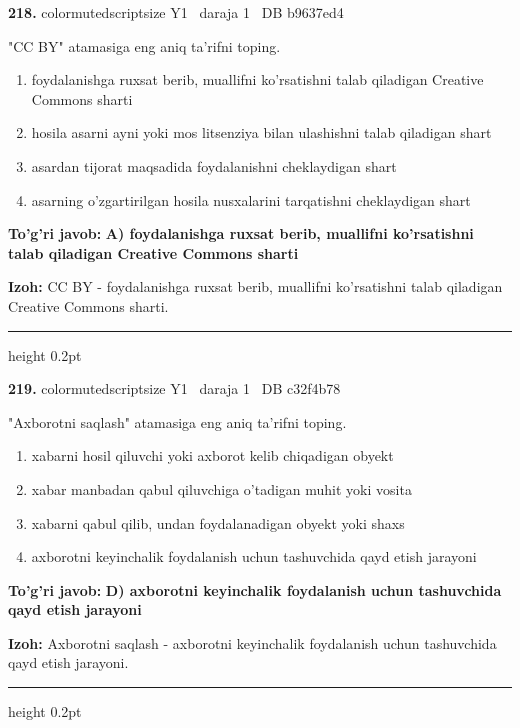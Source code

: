 \documentclass[10pt,a4paper,oneside]{article}
\begin{document}
\noindent\textbf{\color{ink}218.}  {color{muted}scriptsize Y1 \textbullet\ daraja 1 \textbullet\ DB b9637ed4}
\par
"CC BY" atamasiga eng aniq ta'rifni toping.
\begin{enumerate}[label=\Alph*),leftmargin=9mm]
\item foydalanishga ruxsat berib, muallifni ko'rsatishni talab qiladigan Creative Commons sharti
\item hosila asarni ayni yoki mos litsenziya bilan ulashishni talab qiladigan shart
\item asardan tijorat maqsadida foydalanishni cheklaydigan shart
\item asarning o'zgartirilgan hosila nusxalarini tarqatishni cheklaydigan shart
\end{enumerate}
\begin{tcolorbox}[enhanced,breakable,colback=teal!4,colframe=teal!50!black,boxrule=0.5pt,arc=1.1mm,left=3mm,right=3mm,top=1.7mm,bottom=1.7mm,before skip=2mm,after skip=2mm]
\textbf{\color{teal}To'g'ri javob:} \textbf{A) foydalanishga ruxsat berib, muallifni ko'rsatishni talab qiladigan Creative Commons sharti}
\par\smallskip
\textbf{Izoh:} CC BY - foydalanishga ruxsat berib, muallifni ko'rsatishni talab qiladigan Creative Commons sharti.
\end{tcolorbox}
\vspace{2mm}\hrule height 0.2pt \vspace{3mm}

\noindent\textbf{\color{ink}219.}  {color{muted}scriptsize Y1 \textbullet\ daraja 1 \textbullet\ DB c32f4b78}
\par
"Axborotni saqlash" atamasiga eng aniq ta'rifni toping.
\begin{enumerate}[label=\Alph*),leftmargin=9mm]
\item xabarni hosil qiluvchi yoki axborot kelib chiqadigan obyekt
\item xabar manbadan qabul qiluvchiga o'tadigan muhit yoki vosita
\item xabarni qabul qilib, undan foydalanadigan obyekt yoki shaxs
\item axborotni keyinchalik foydalanish uchun tashuvchida qayd etish jarayoni
\end{enumerate}
\begin{tcolorbox}[enhanced,breakable,colback=teal!4,colframe=teal!50!black,boxrule=0.5pt,arc=1.1mm,left=3mm,right=3mm,top=1.7mm,bottom=1.7mm,before skip=2mm,after skip=2mm]
\textbf{\color{teal}To'g'ri javob:} \textbf{D) axborotni keyinchalik foydalanish uchun tashuvchida qayd etish jarayoni}
\par\smallskip
\textbf{Izoh:} Axborotni saqlash - axborotni keyinchalik foydalanish uchun tashuvchida qayd etish jarayoni.
\end{tcolorbox}
\vspace{2mm}\hrule height 0.2pt \vspace{3mm}
\end{document}
